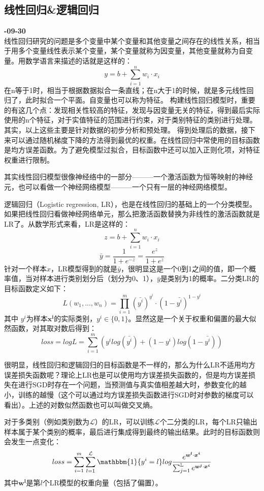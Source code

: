 \subsection{线性回归\&逻辑回归}
\textbf{-09-30}\\
线性回归研究的问题是多个变量中某个变量和其他变量之间存在的线性关系，相当于用多个变量线性表示某个变量，某个变量就称为因变量，其他变量就称为自变量。用数学语言来描述的话就是这样的：
$$
y=b + \sum_{i=1}^{n} w_i \cdot x_i 
$$
在n等于1时，相当于根据数据拟合一条直线；在n大于1的时候，就是多元线性回归了，此时拟合一个平面。自变量也可以称为特征。
构建线性回归模型时，重要的有这几个点：发现相关性较高的特征，发现与因变量无关的特征，得到最后实际使用的n个特征，对于实值特征的范围进行约束，对于类别特征的类别进行处理。其实，以上这些主要是针对数据的初步分析和预处理。
得到处理后的数据，接下来可以通过随机梯度下降的方法得到最优的权重。在线性回归中常使用的目标函数是均方误差函数。为了避免模型过拟合，目标函数中还可以加入正则化项，对特征权重进行限制。

其实线性回归模型很像神经络中的一部分———一个激活函数为恒等映射的神经元，也可以看做一个神经网络模型———一个只有一层的神经网络模型。

逻辑回归（Logistic regression, LR），也是在线性回归的基础上的一个分类模型。如果把线性回归看做神经网络单元，那么把激活函数替换为非线性的激活函数就是LR了。从数学形式来看，LR是这样的：
$$
z = b + \sum_{i=1}^{n} w_i \cdot x_i 
$$
$$
\bar{y} = \frac{1}{1 + e^{-z}} = \frac{e^z}{1 + e^z}
$$
针对一个样本$x$，LR模型得到的就是$\bar{y}$，很明显这是一个0到1之间的值，即一个概率值，当对样本进行类别划分后（划分为0、1），$\bar{y}$是类别为1的概率。二分类LR的目标函数定义如下：
$$
L(w_1,...,w_n) = \prod_{i = 1}^{m} (\bar{y^i} )^{y^i} \cdot ( 1 - \bar{y^i}) ^ {1 - y^i}
$$
其中 $y^i$为样本$\boldsymbol{x^i}$的实际类别，$y^i \in \{0, 1\}$。显然这是一个关于权重和偏置的最大似然函数，对其取对数后得到：
$$
loss = log L = \sum_{i=1}^{m} \left( y^i log (\bar{y^i}) + (1 - y^i) log ( 1 - \bar{y^i}) \right)
$$

很明显，线性回归和逻辑回归的目标函数是不一样的，那么为什么LR不适用均方误差损失函数呢？理论上LR也是可以使用均方误差损失函数的，但是均方误差损失在进行SGD时存在一个问题，当预测值与真实值相差越大时，参数变化的越小，训练的越慢（{\color{red}这个可以通过均方误差损失函数进行SGD时对参数的梯度可以看出}）。上述的对数似然函数也可以叫做交叉熵。

对于多类别（例如类别数为$\mathcal{L}$）的LR，可以训练$\mathcal{L}$个二分类的LR，每个LR只输出样本属于某个类别的概率，最后进行集成得到最终的输出结果。此时的目标函数则会发生一点变化：
$$
loss = \sum_{i=1}^{m} \sum_{l=1}^{\mathcal{L}} \mathbbm{1}\{y^i = l\} log \frac{e^{ \boldsymbol{w^l} \cdot \boldsymbol{x^i} } }{ \sum_{j=1}^{\mathbb{L}} e^{ \boldsymbol{w^j} \cdot \boldsymbol{x^i}} }
$$
其中$\boldsymbol{w^l}$是第$l$个LR模型的权重向量（包括了偏置）。


